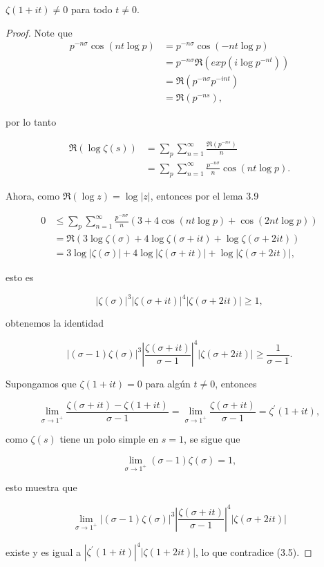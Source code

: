 \begin{theorem}
$\zeta(1+it)\neq 0$ para todo $t\neq 0$.
\end{theorem}

\begin{proof}
Note que
    \begin{align*}
        p^{-n\sigma}\cos(nt\log p)&=p^{-n\sigma}\cos(-nt\log p)\\
        &=p^{-n\sigma}\Re(exp(i\log p^{-nt}))\\
        &=\Re(p^{-n\sigma}p^{-int})\\
        &=\Re(p^{-ns})
    ,\end{align*}

por lo tanto

\begin{align*}
    \Re(\log\zeta(s))&=\sum_{p}\sum_{n=1}^{\infty} \frac{\Re(p^{-ns})}{n}\\
    &=\sum_{p}\sum_{n=1}^{\infty} \frac{p^{-n\sigma}}{n}\cos(nt\log p)
.\end{align*}

Ahora, como $\Re(\log z)=\log|z|$, entonces por el lema 3.9

\begin{align*}
    0&\leq \sum_p \sum_{n=1}^{\infty}\frac{p^{-n \sigma}}{n}(3+4 \cos (n t \log p)+\cos (2 n t \log p))\\
     &=\Re(3\log\zeta(\sigma)+4\log\zeta(\sigma+it)+\log\zeta(\sigma+2it))\\
    &=3 \log |\zeta(\sigma)|+4 \log |\zeta(\sigma+i t)|+\log |\zeta(\sigma+2 i t)|
,\end{align*}

esto es

$$
|\zeta(\sigma)|^3|\zeta(\sigma+i t)|^4|\zeta(\sigma+2 i t)| \geqslant 1,
$$

obtenemos la identidad

\begin{equation}
    |(\sigma-1) \zeta(\sigma)|^3\left|\frac{\zeta(\sigma+i t)}{\sigma-1}\right|^4|\zeta(\sigma+2 i t)| \geqslant \frac{1}{\sigma-1} .
\end{equation}

Supongamos que $\zeta(1+it)=0$ para algún $t\neq 0$, entonces

$$\lim_{\sigma \to 1^+}\frac{\zeta(\sigma+it)-\zeta(1+it)}{\sigma-1}=\lim_{\sigma \to 1^+}\frac{\zeta(\sigma+it)}{\sigma-1}=\zeta^{\prime}(1+it),$$

como $\zeta(s)$ tiene un polo simple en $s=1$, se sigue que

$$\lim_{\sigma \to 1^+} (\sigma-1)\zeta(\sigma)=1,$$

esto muestra que 

$$\lim _{\sigma \to 1^+}|(\sigma-1) \zeta(\sigma)|^3\left|\frac{\zeta(\sigma+i t)}{\sigma-1}\right|^4|\zeta(\sigma+2 i t)|$$

existe y es igual a $\left|\zeta^{\prime}(1+i t)\right|^4|\zeta(1+2 i t)|$, lo que contradice (3.5).
\end{proof}

